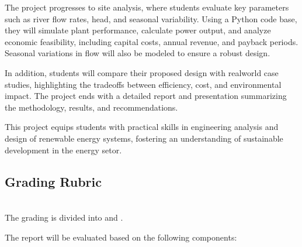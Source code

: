 \documentclass[letterpaper,10pt,english]{jupyterBook}
\begin{document}
\sphinxAtStartPar
The project progresses to site analysis, where students evaluate key
parameters such as river flow rates, head, and seasonal variability.
Using a Python code base, they will simulate plant performance,
calculate power output, and analyze economic feasibility, including
capital costs, annual revenue, and payback periods. Seasonal variations
in flow will also be modeled to ensure a robust design.

\sphinxAtStartPar
In addition, students will compare their proposed design with real\sphinxhyphen{}world
case studies, highlighting the trade\sphinxhyphen{}offs between efficiency, cost, and
environmental impact. The project ends with a detailed report and
presentation summarizing the methodology, results, and recommendations.

\sphinxAtStartPar
This project equips students with practical skills in engineering
analysis and design of renewable energy systems, fostering an
understanding of sustainable development in the energy setor.


\subsection{Grading Rubric}
\label{\detokenize{ProjectSyllabus:id7}}
\sphinxAtStartPar
{}\\
The grading is divided into  and .

\sphinxAtStartPar
The report will be evaluated based on the following components:
\end{document}
